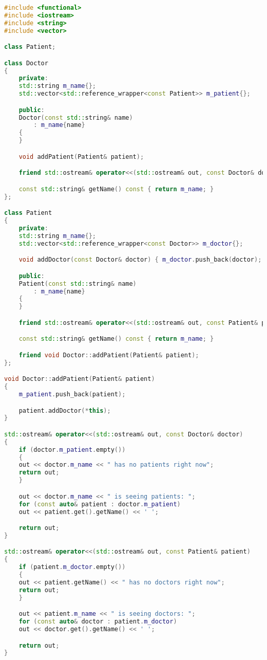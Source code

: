 \documentclass[../../LearnCpp.tex]{subfiles}
\begin{document}
\begin{lstlisting}[language=C++]
#include <functional>
#include <iostream>
#include <string>
#include <vector>

class Patient;

class Doctor
{
    private:
    std::string m_name{};
    std::vector<std::reference_wrapper<const Patient>> m_patient{};

    public:
    Doctor(const std::string& name)
        : m_name{name}
    {
    }

    void addPatient(Patient& patient);

    friend std::ostream& operator<<(std::ostream& out, const Doctor& doctor);

    const std::string& getName() const { return m_name; }
};

class Patient
{
    private:
    std::string m_name{};
    std::vector<std::reference_wrapper<const Doctor>> m_doctor{};

    void addDoctor(const Doctor& doctor) { m_doctor.push_back(doctor); }

    public:
    Patient(const std::string& name)
        : m_name{name}
    {
    }

    friend std::ostream& operator<<(std::ostream& out, const Patient& patient);

    const std::string& getName() const { return m_name; }

    friend void Doctor::addPatient(Patient& patient);
};

void Doctor::addPatient(Patient& patient)
{
    m_patient.push_back(patient);

    patient.addDoctor(*this);
}

std::ostream& operator<<(std::ostream& out, const Doctor& doctor)
{
    if (doctor.m_patient.empty())
    {
    out << doctor.m_name << " has no patients right now";
    return out;
    }

    out << doctor.m_name << " is seeing patients: ";
    for (const auto& patient : doctor.m_patient)
    out << patient.get().getName() << ' ';

    return out;
}

std::ostream& operator<<(std::ostream& out, const Patient& patient)
{
    if (patient.m_doctor.empty())
    {
    out << patient.getName() << " has no doctors right now";
    return out;
    }

    out << patient.m_name << " is seeing doctors: ";
    for (const auto& doctor : patient.m_doctor)
    out << doctor.get().getName() << ' ';

    return out;
}
\end{lstlisting}
\end{document}
